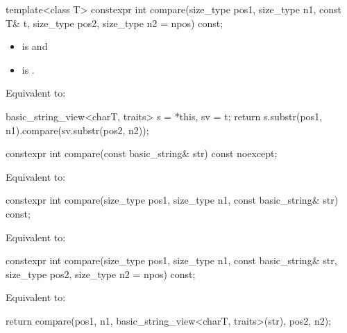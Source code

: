 %
\begin{itemdecl}
template<class T>
  constexpr int compare(size_type pos1, size_type n1, const T& t,
                        size_type pos2, size_type n2 = npos) const;
\end{itemdecl}

\begin{itemdescr}
\pnum
\constraints
\begin{itemize}
\item
{} is
 and
\item
{} is
.
\end{itemize}

\pnum
\effects
Equivalent to:
\begin{codeblock}
basic_string_view<charT, traits> s = *this, sv = t;
return s.substr(pos1, n1).compare(sv.substr(pos2, n2));
\end{codeblock}
\end{itemdescr}

%
\begin{itemdecl}
constexpr int compare(const basic_string& str) const noexcept;
\end{itemdecl}

\begin{itemdescr}
\pnum
\effects
Equivalent to:
\end{itemdescr}

%
\begin{itemdecl}
constexpr int compare(size_type pos1, size_type n1, const basic_string& str) const;
\end{itemdecl}

\begin{itemdescr}
\pnum
\effects
Equivalent to:
\end{itemdescr}

%
\begin{itemdecl}
constexpr int compare(size_type pos1, size_type n1, const basic_string& str,
                      size_type pos2, size_type n2 = npos) const;
\end{itemdecl}

\begin{itemdescr}
\pnum
\effects
Equivalent to:
\begin{codeblock}
return compare(pos1, n1, basic_string_view<charT, traits>(str), pos2, n2);
\end{codeblock}
\end{itemdescr}

